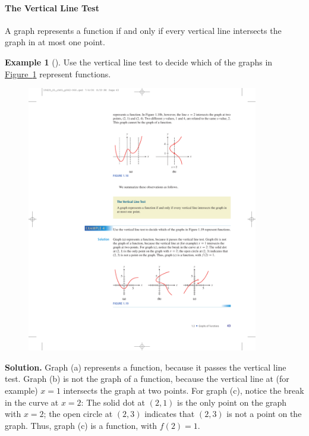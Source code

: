 \documentclass[10pt,]{book}
\theoremstyle{plain}
\theoremstyle{definition}
\theoremstyle{definition}
\newtheorem{example}[theorem]{Example}
\begin{document}
\paragraph[The Vertical Line Test]{The Vertical Line Test}\label{paragraphs-2}
A graph represents a function if and only if every vertical line intersects the graph in
at most one point.%
\begin{example}[]\label{example-vertical-line-test}
Use the vertical line test to decide which of the graphs in \hyperref[fig-vertical-line-test2]{Figure~\ref{fig-vertical-line-test2}}  represent functions.%
\leavevmode%
\begin{figure}
\centering
\includegraphics[width=0.90\textwidth,]{images/fig-vertical-line-test2.pdf}\caption{\label{fig-vertical-line-test2}}
\end{figure}
\par\medskip\noindent%
\textbf{Solution.}\quad 
    Graph (a) represents a function, because it passes the vertical line test. Graph (b) is not the graph of a function, because the vertical line at (for example) \(x = 1\) intersects the graph at two points. For graph (c), notice the break in the curve at \(x = 2\): The solid dot at \((2, 1)\) is the only point on the graph with \(x = 2\); the open circle at \((2, 3)\) indicates that \((2, 3)\) is not a point on the graph. Thus, graph (c) is a function, with \(f(2) = 1\).
\end{example}
\end{document}
